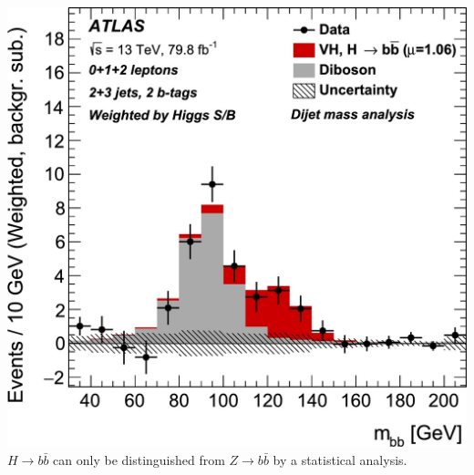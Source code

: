 \documentclass[10pt,t]{beamer}
\begin{document}
\begin{frame}
\begin{columns}
    \includegraphics[width=\textwidth]{vhbb-result} \\[1ex]
    $H\rightarrow b\bar{b}$ can only be distinguished from $Z\rightarrow b\bar{b}$ by a statistical analysis.
\end{columns}
\vspace*{-3pt}
\end{frame}
\end{document}
